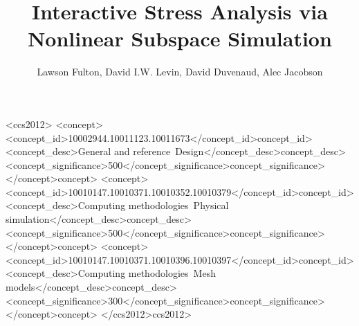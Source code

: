 \documentclass[sigconf, authorversion, review]{acmart}
\begin{document}
\title{Interactive Stress Analysis via Nonlinear Subspace Simulation}

\author{Lawson Fulton, David I.W. Levin, David Duvenaud, Alec Jacobson}

\renewcommand\shortauthors{Fulton, L. et al}



%
%
\begin{CCSXML}
    <ccs2012>
        <concept>
            <concept_id>10002944.10011123.10011673</concept_id>concept_id>
            <concept_desc>General and reference~Design</concept_desc>concept_desc>
            <concept_significance>500</concept_significance>concept_significance>
        </concept>concept>
        <concept>
            <concept_id>10010147.10010371.10010352.10010379</concept_id>concept_id>
            <concept_desc>Computing methodologies~Physical
            simulation</concept_desc>concept_desc>
            <concept_significance>500</concept_significance>concept_significance>
        </concept>concept>
        <concept>
            <concept_id>10010147.10010371.10010396.10010397</concept_id>concept_id>
            <concept_desc>Computing methodologies~Mesh
            models</concept_desc>concept_desc>
            <concept_significance>300</concept_significance>concept_significance>
        </concept>concept>
    </ccs2012>ccs2012>
\end{CCSXML}

\end{document}
